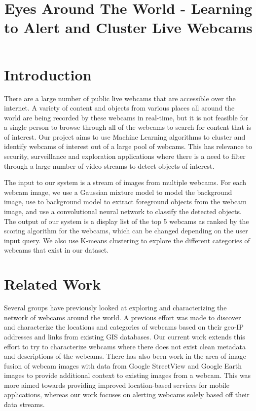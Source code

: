 \documentclass[10pt]{article} %
\title{Eyes Around The World - Learning to Alert and Cluster Live Webcams}
\begin{document}
\maketitle


\section{Introduction}
There are a large number of public live webcams that are accessible over the internet. A variety of content and objects from various places all around the world are being recorded by these webcams in real-time, but it is not feasible for a single person to browse through all of the webcams to search for content that is of interest. Our project aims to use Machine Learning algorithms to cluster and identify webcams of interest out of a large pool of webcams. This has relevance to security, surveillance and exploration applications where there is a need to filter through a large number of video streams to detect objects of interest. 

The input to our system is a stream of images from multiple webcams. For each webcam image, we use a Gaussian mixture model to model the background image, use to background model to extract foreground objects from the webcam image, and use a convolutional neural network to classify the detected objects. The output of our system is a display list of the top 5 webcams as ranked by the scoring algorithm for the webcams, which can be changed depending on the user input query. We also use K-means clustering to explore the different categories of webcams that exist in our dataset. 

\section{Related Work}
Several groups have previously looked at exploring and characterizing the network of webcams around the world. A previous effort was made to discover and characterize the locations and categories of webcams \cite{webcamnetwork} based on their geo-IP addresses and links from existing GIS databases. Our current work extends this effort to try to characterize webcams where there does not exist clean metadata and descriptions of the webcams. There has also been work in the area of image fusion \cite{billioneyes} of webcam images with data from Google StreetView and Google Earth images to provide additional context to existing images from a webcam. This was more aimed towards providing improved location-based services for mobile applications, whereas our work focuses on alerting webcams solely based off their data streams. 
\end{document}
